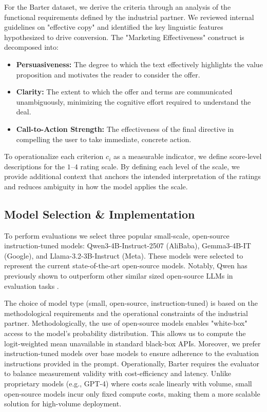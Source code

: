 For the Barter dataset, we derive the criteria through an analysis of the functional requirements defined by the industrial partner. We reviewed internal guidelines on "effective copy" and identified the key linguistic features hypothesized to drive conversion. The "Marketing Effectiveness" construct is decomposed into:
\begin{itemize}
    \item \textbf{Persuasiveness:} The degree to which the text effectively highlights the value proposition and motivates the reader to consider the offer.
    \item \textbf{Clarity:} The extent to which the offer and terms are communicated unambiguously, minimizing the cognitive effort required to understand the deal.
    \item \textbf{Call-to-Action Strength:} The effectiveness of the final directive in compelling the user to take immediate, concrete action.
\end{itemize}


To operationalize each criterion $c_i$ as a measurable indicator, we define score-level descriptions for the $1$--$4$ rating scale. By defining each level of the scale, we provide additional context that anchors the intended interpretation of the ratings and reduces ambiguity in how the model applies the scale.

\subsection{Model Selection \& Implementation}

To perform evaluations we select three popular small-scale, open-source instruction-tuned models: Qwen3-4B-Instruct-2507 \citep{qwen3technicalreport} (AliBaba), Gemma3-4B-IT \citep{gemma_2025} (Google), and Llama-3.2-3B-Instruct (Meta). These models were selected to represent the current state-of-the-art open-source models. Notably, Qwen has previously shown to outperform other similar sized open-source LLMs in evaluation tasks \citep{gu_survey_2025}. 

The choice of model type (small, open-source, instruction-tuned) is based on the methodological requirements and the operational constraints of the industrial partner. Methodologically, the use of open-source models enables "white-box" access to the model's probability distribution. This allows us to compute the logit-weighted mean unavailable in standard black-box APIs. Moreover, we prefer instruction-tuned models over base models to ensure adherence to the evaluation instructions provided in the prompt. Operationally, Barter requires the evaluator to balance measurement validity with cost-efficiency and latency. Unlike proprietary models (e.g., GPT-4) where costs scale linearly with volume, small open-source models incur only fixed compute costs, making them a more scalable solution for high-volume deployment. 

